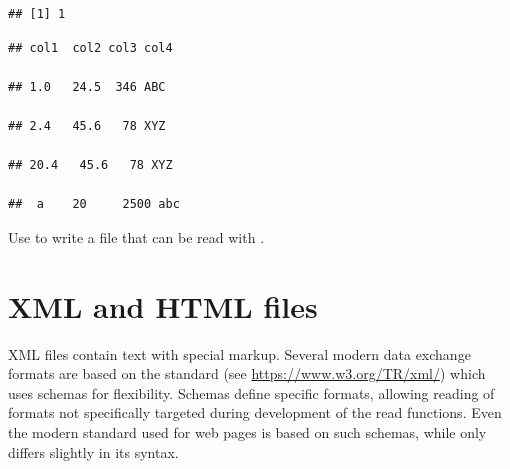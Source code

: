 \documentclass[krantz2]{krantz}\usepackage{knitr}
\begin{document}
\begin{knitrout}\footnotesize
{}\color{fgcolor}\begin{kframe}
\begin{alltt}
 \hlkwb{<-} \hlstd{(} \hlstd{=} \hlstd{)}
\end{alltt}
\begin{verbatim}
## [1] 1
\end{verbatim}
\begin{alltt}
\end{alltt}
\begin{verbatim}
## col1  col2 col3 col4

## 1.0   24.5  346 ABC

## 2.4   45.6   78 XYZ

## 20.4   45.6   78 XYZ

##  a    20     2500 abc

\end{verbatim}
\end{kframe}
\end{knitrout}

\begin{advplayground}
Use  to write a file that can be read with .
\end{advplayground}

\section{XML and HTML files}

XML files contain text with special markup. Several modern data exchange formats are based on the  standard (see \url{https://www.w3.org/TR/xml/}) which uses schemas for flexibility. Schemas define specific formats, allowing reading of formats not specifically targeted during development of the read functions. Even the modern  standard used for web pages is based on such schemas, while  only differs slightly in its syntax.

\subsection[`xml2']{}
\end{document}

